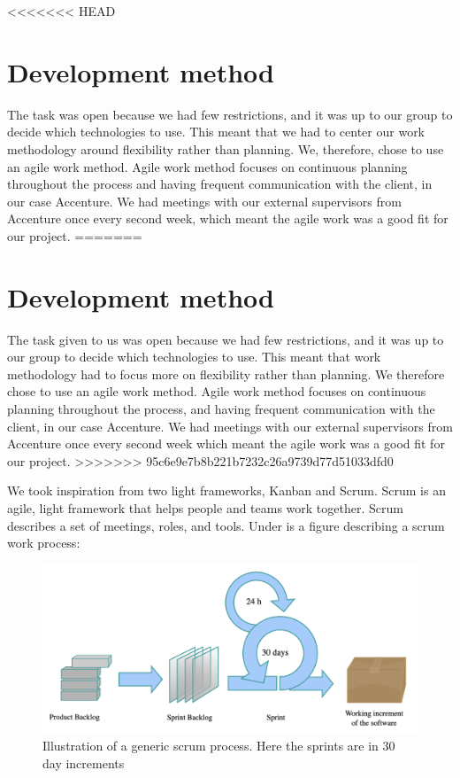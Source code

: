 <<<<<<< HEAD
\section{Development method}
The task was open because we had few restrictions, and it was up to our group to decide which technologies to use. This meant that we had to center our work methodology around flexibility rather than planning. We, therefore, chose to use an agile work method. Agile work method focuses on continuous planning throughout the process and having frequent communication with the client, in our case Accenture. We had meetings with our external supervisors from Accenture once every second week, which meant the agile work was a good fit for our project. 
=======
\section{Development method}\label{devmethod}
The task given to us was open because we had few restrictions, and it was up to our group to decide which technologies to use. This meant that work methodology had to focus more on flexibility rather than planning. We therefore chose to use an agile work method. Agile work method focuses on continuous planning throughout the process, and having frequent communication with the client, in our case Accenture. We had meetings with our external supervisors from Accenture once every second week which meant the agile work was a good fit for our project. 
>>>>>>> 95c6e9e7b8b221b7232c26a9739d77d51033dfd0

We took inspiration from two light frameworks, Kanban and Scrum. Scrum is an agile,  light framework that helps people and teams work together. Scrum describes a set of meetings, roles, and tools. Under is a figure describing a scrum work process:

\begin{figure}[h!]
	\centering
	\includegraphics[width=1\linewidth]{figures/scrum_process}
	\caption[scrum process]{Illustration of a generic scrum process. Here the sprints are in 30 day increments}
	\label{fig:scrumprocess}
\end{figure}


